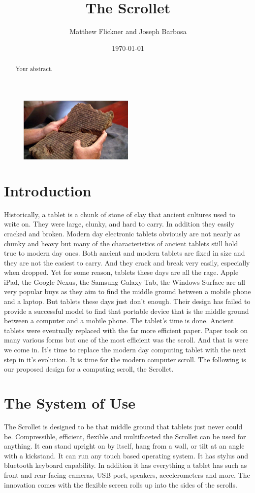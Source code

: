 \documentclass[a4paper]{article}
\title{The Scrollet}
\author{Matthew Flickner and Joseph Barbosa}
\date{\today}
\begin{document}
\maketitle

\begin{abstract}
Your abstract.
\end{abstract}

\begin{figure}[H]
\centering
\includegraphics[width=0.5\textwidth]{ancienttablet.jpg}
\end{figure}

\section{Introduction}
Historically, a tablet is a chunk of stone of clay that ancient cultures used to write on. They were large, clunky, and hard to carry. In addition they easily cracked and broken. Modern day electronic tablets obviously are not nearly as chunky and heavy but many of the characteristics of ancient tablets still hold true to modern day ones. Both ancient and modern tablets are fixed in size and they are not the easiest to carry. And they crack and break very easily, especially when dropped. Yet for some reason, tablets these days are all the rage. Apple iPad, the Google Nexus, the Samsung Galaxy Tab, the Windows Surface are all very popular buys as they aim to find the middle ground between a mobile phone and a laptop. But tablets these days just don't enough. Their design has failed to provide a successful model to find that portable device that is the middle ground between a computer and a mobile phone. The tablet's time is done. Ancient tablets were eventually replaced with the far more efficient paper. Paper took on many various forms but one of the most efficient was the scroll. And that is were we come in. It's time to replace the modern day computing tablet with the next step in it's evolution. It is time for the modern computer scroll. The following is our proposed design for a computing scroll, the Scrollet.

\section{The System of Use}
\label{sec:system}
The Scrollet is designed to be that middle ground that tablets just never could be. Compressible, efficient, flexible and multifaceted the Scrollet can be used for anything. It can stand upright on by itself, hang from a wall, or tilt at an angle with a kickstand. It can run any touch based operating system. It has stylus and bluetooth keyboard capability. In addition it has everything a tablet has such as front and rear-facing cameras, USB port, speakers, accelerometers and more. The innovation comes with the flexible screen rolls up into the sides of the scrolls.
\end{document}
